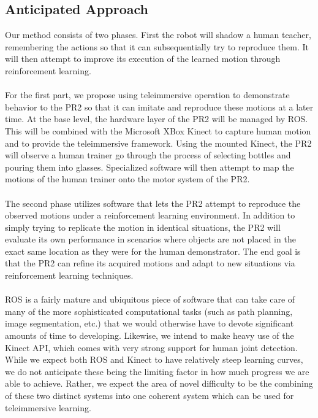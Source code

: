 \documentclass{sig-alternate}
\begin{document}
\subsection{Anticipated Approach}
\label{subsec:approach}
Our method consists of two phases. First the robot will shadow a human teacher,
remembering the actions so that it can subsequentially try to reproduce them. 
It will then attempt to improve its execution of the learned motion through 
reinforcement learning.
\\
\\For the first part, we propose using teleimmersive operation to demonstrate
behavior to the PR2 so that it can imitate and reproduce these motions at a
later time. At the base level, the hardware layer of the PR2 will be managed 
by ROS. This will be combined with the Microsoft XBox Kinect to capture human
motion and to provide the teleimmersive framework.
Using the mounted Kinect, the PR2 will observe a human trainer go
through the process of selecting bottles and pouring them into glasses. 
Specialized software will then attempt to map the motions of the human trainer
onto the motor system of the PR2.
\\
\\The second phase utilizes software that lets the PR2 attempt to reproduce
the observed motions under a reinforcement learning environment. In addition
to simply trying to replicate the motion in identical situations,
the PR2 will evaluate its own performance in scenarios where objects are not 
placed in the exact same location as they were for the human demonstrator.
The end goal is that the PR2 can refine its acquired motions and adapt to new
situations via reinforcement learning techniques. 
\\ 
\\ROS is a fairly mature and ubiquitous piece of software that can take care of
many of the more sophisticated computational tasks (such as path planning, 
image segmentation, etc.) that we would otherwise have to devote significant 
amounts of time to developing.  
Likewise, we intend to make heavy use of the Kinect API, which comes with very
strong support for human joint detection.
While we expect both ROS and Kinect to have relatively steep learning curves,
we do not anticipate these being the limiting factor in how much progress we
are able to achieve. 
Rather, we expect the area of novel difficulty to be the combining of these
two distinct systems into one coherent system which can be used for
teleimmersive learning.
\end{document}
